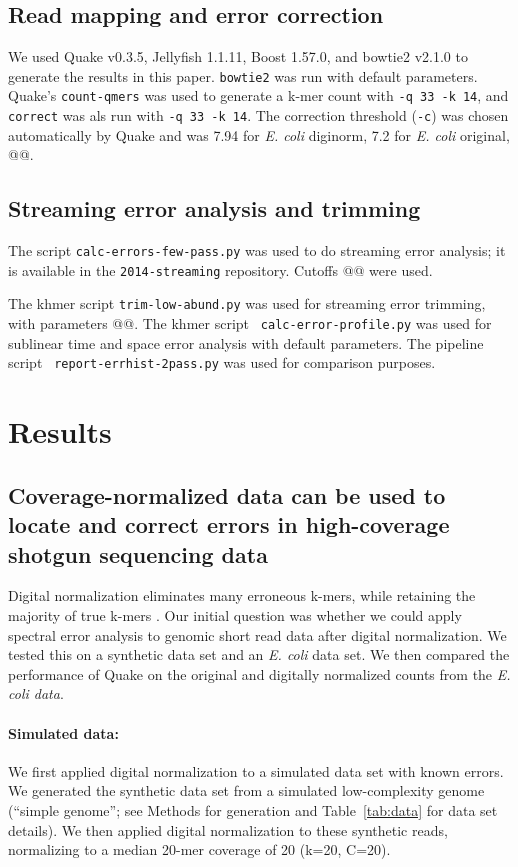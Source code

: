 \documentclass{article}
\begin{document}
\subsection{Read mapping and error correction}

We used Quake v0.3.5, Jellyfish 1.1.11, Boost 1.57.0, and bowtie2
v2.1.0 to generate the results in this paper.  {\tt bowtie2} was run with
default parameters.  Quake's {\tt count-qmers} was used to generate a k-mer
count with {\tt -q 33 -k 14}, and {\tt correct} was als run
with {\tt -q 33 -k 14}.   The correction threshold ({\tt -c}) was chosen
automatically by Quake and was 7.94 for {\em E. coli} diginorm, 7.2 for
{\em E. coli} original, @@.

\subsection{Streaming error analysis and trimming}

The script {\tt calc-errors-few-pass.py} was used to do streaming
error analysis; it is available in the {\tt 2014-streaming}
repository.  Cutoffs @@ were used.

The khmer script {\tt trim-low-abund.py} was used for streaming error
trimming, with parameters @@.  The khmer script {\tt
  calc-error-profile.py} was used for sublinear time and space error
analysis with default parameters.  The pipeline script {\tt
  report-errhist-2pass.py} was used for comparison purposes.

\section{Results}

\subsection{Coverage-normalized data can be used to locate
and correct errors in high-coverage shotgun sequencing data}

Digital normalization eliminates many erroneous k-mers, while
retaining the majority of true k-mers \cite{Brown2012}.  Our initial
question was whether we could apply spectral error analysis to genomic
short read data after digital normalization.  We tested this on a
synthetic data set and an {\em E. coli} data set.  We then compared
the performance of Quake on the original and digitally normalized
counts from the {\em E. coli data}.

\paragraph{Simulated data:}
We first applied digital normalization to a simulated data set with
known errors.  We generated the synthetic data set from a simulated
low-complexity genome (``simple genome''; see Methods for generation
and Table~\ref{tab:data} for data set details). We then applied
digital normalization to these synthetic reads, normalizing to a
median 20-mer coverage of 20 (k=20, C=20).
\end{document}

